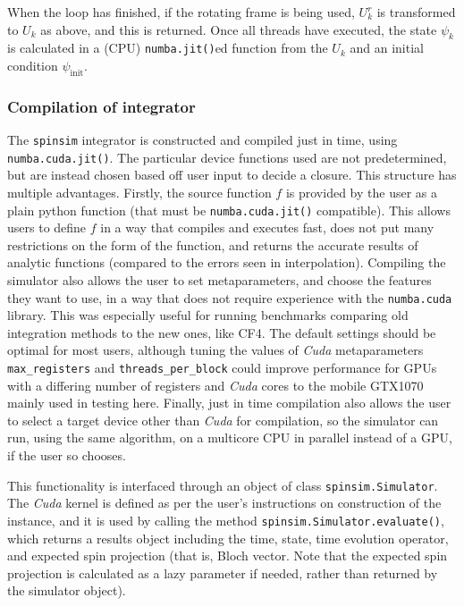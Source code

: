 \documentclass{jors}
\begin{document}
			When the loop has finished, if the rotating frame is being used, \(U^r_k\) is transformed to \(U_k\) as above, and this is returned. Once all threads have executed, the state \(\psi_k\) is calculated in a (CPU) \texttt{numba.jit()}ed function from the \(U_k\) and an initial condition \(\psi_{\mathrm{init}}\).
	
	
		\subsubsection*{Compilation of integrator}
			The \texttt{spinsim} integrator is constructed and compiled just in time, using \texttt{numba.cuda.jit()}. The particular device functions used are not predetermined, but are instead chosen based off user input to decide a closure. This structure has multiple advantages. Firstly, the source function \(f\) is provided by the user as a plain python function (that must be \texttt{numba.cuda.jit()} compatible). This allows users to define \(f\) in a way that compiles and executes fast, does not put many restrictions on the form of the function, and returns the accurate results of analytic functions (compared to the errors seen in interpolation). Compiling the simulator also allows the user to set metaparameters, and choose the features they want to use, in a way that does not require experience with the \texttt{numba.cuda} library. This was especially useful for running benchmarks comparing old integration methods to the new ones, like CF4. The default settings should be optimal for most users, although tuning the values of \emph{Cuda} metaparameters \texttt{max\_registers} and \texttt{threads\_per\_block} could improve performance for GPUs with a differing number of registers and \emph{Cuda} cores to the mobile GTX1070 mainly used in testing here. Finally, just in time compilation also allows the user to select a target device other than \emph{Cuda} for compilation, so the simulator can run, using the same algorithm, on a multicore CPU in parallel instead of a GPU, if the user so chooses.
			
			This functionality is interfaced through an object of class \texttt{spinsim.Simulator}. The \emph{Cuda} kernel is defined as per the user’s instructions on construction of the instance, and it is used by calling the method \texttt{spinsim.Simulator.evaluate()}, which returns a results object including the time, state, time evolution operator, and expected spin projection (that is, Bloch vector. Note that the expected spin projection is calculated as a lazy parameter if needed, rather than returned by the simulator object).
\end{document}
